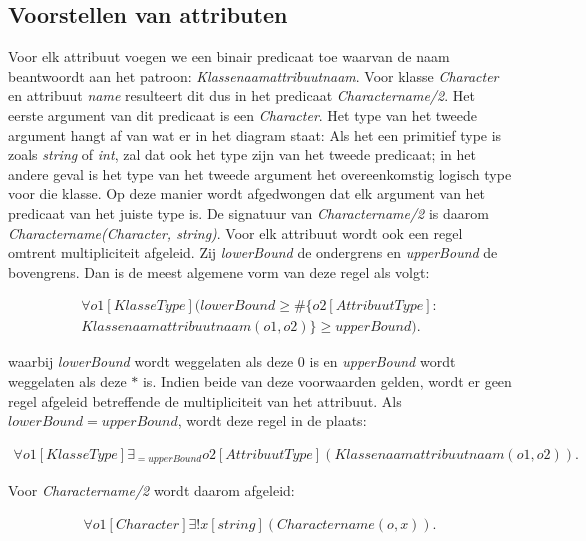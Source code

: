 \subsection{Voorstellen van attributen}
Voor elk attribuut voegen we een binair predicaat toe waarvan de naam beantwoordt aan het patroon: \textit{Klassenaamattribuutnaam}. Voor klasse \textit{Character} en attribuut \textit{name} resulteert dit dus in het predicaat \textit{Charactername/2}. Het eerste argument van dit predicaat is een \textit{Character}. Het type van het tweede argument hangt af van wat er in het diagram staat: Als het een primitief type is zoals \textit{string} of \textit{int}, zal dat ook het type zijn van het tweede predicaat; in het andere geval is het type van het tweede argument het overeenkomstig logisch type voor die klasse. Op deze manier wordt afgedwongen dat elk argument van het predicaat van het juiste type is.
De signatuur van \textit{Charactername/2} is daarom \textit{Charactername(Character, string)}.
Voor elk attribuut wordt ook een regel omtrent multipliciteit afgeleid. Zij \textit{lowerBound} de ondergrens en \textit{upperBound} de bovengrens. Dan is de meest algemene vorm van deze regel als volgt:
	
\begin{align*}
	\forall{o1}[KlasseType](lowerBound \geq \#\{o2 [AttribuutType] : \\ Klassenaamattribuutnaam(o1,o2)\} \geq upperBound).
\end{align*}
	
waarbij \textit{lowerBound} wordt weggelaten als deze $0$ is en \textit{upperBound} wordt weggelaten als deze $*$ is. Indien beide van deze voorwaarden gelden, wordt er geen regel afgeleid betreffende de multipliciteit van het attribuut. Als $lowerBound = upperBound$, wordt deze regel in de plaats:
	
\begin{align*}
	\forall{o1}[KlasseType] \exists_{=upperBound}{o2}[AttribuutType](Klassenaamattribuutnaam(o1,o2)).
\end{align*}
	
Voor \textit{Charactername/2} wordt daarom afgeleid:
	
\begin{align*}
	\forall{o1}[Character]\exists!{x}[string](Charactername(o,x)).
\end{align*}

